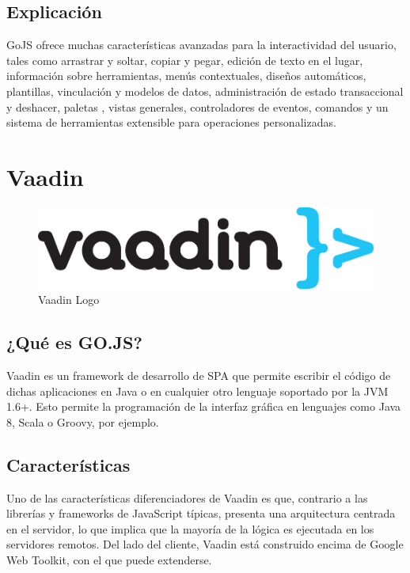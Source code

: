 \documentclass[a4paper,12pt]{book}
\begin{document}
	 	
	 		\subsection{Explicación}
	 		GoJS ofrece muchas características avanzadas para la interactividad del usuario, tales como arrastrar y soltar, copiar y pegar, edición de texto en el lugar, información sobre herramientas, menús contextuales, diseños automáticos, plantillas, vinculación y modelos de datos, administración de estado transaccional y deshacer, paletas , vistas generales, controladores de eventos, comandos y un sistema de herramientas extensible para operaciones personalizadas.
	 
	 
	 	\section{Vaadin}
	 	
	 		\begin{figure}[H]
	 			\centering
	 			\includegraphics[scale=1]{Vaadin-logo.png}
	 			\caption{Vaadin Logo}\label{fig:Vaadin-logo}
	 		\end{figure}
 		
 			\subsection{¿Qué es GO.JS?}
 				Vaadin\cite{vaadin} es un framework de desarrollo de SPA que permite escribir el código de dichas aplicaciones en Java o en cualquier otro lenguaje soportado por la JVM 1.6+. Esto permite la programación de la interfaz gráfica en lenguajes como Java 8, Scala o Groovy, por ejemplo.
 			
 			\subsection{Características}
 				Uno de las características diferenciadores de Vaadin es que, contrario a las librerías y frameworks de JavaScript típicas, presenta una arquitectura centrada en el servidor, lo que implica que la mayoría de la lógica es ejecutada en los servidores remotos. Del lado del cliente, Vaadin está construido encima de Google Web Toolkit, con el que puede extenderse.
 	
\end{document}
